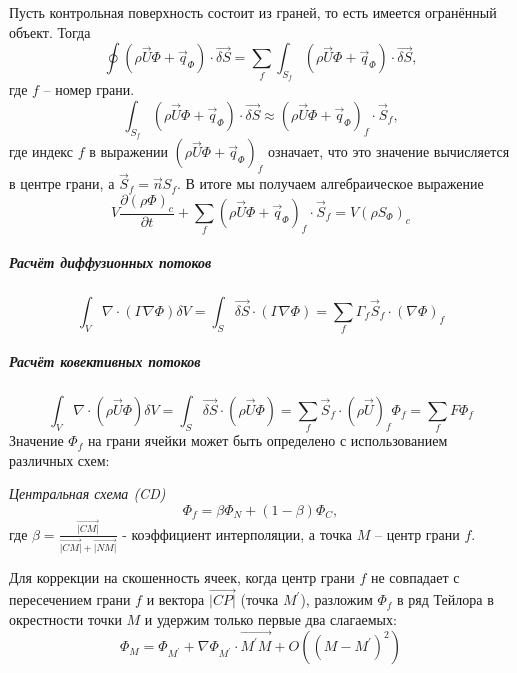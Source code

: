 			Пусть контрольная поверхность состоит из граней, то есть имеется огранённый объект. Тогда
			\begin{equation}
				\oint\left(\rho \vec{U} \Phi + \vec{q}_{\Phi} \right) \cdot \vec{\delta S} = \sum_f \int_{S_f} \left(\rho \vec{U} \Phi + \vec{q}_{\Phi} \right) \cdot \vec{\delta S},
			\end{equation}
			где $f$ -- номер грани.
			\begin{equation}
				\int_{S_f} \left(\rho \vec{U} \Phi + \vec{q}_{\Phi} \right) \cdot \vec{\delta S} \approx \left(\rho \vec{U} \Phi + \vec{q}_{\Phi} \right)_f \cdot \vec{S}_f,
			\end{equation}
			где индекс $f$ в выражении $\left(\rho \vec{U} \Phi  + \vec{q}_{\Phi}\right)_f$ означает, что это значение вычисляется в центре грани, а $\vec{S}_f = \vec{n} S_f$. В итоге мы получаем алгебраическое выражение
			\begin{equation}
				V\frac{\partial \left( \rho \Phi \right)_c}{\partial t} + \sum_f \left( \rho \vec{U} \Phi + \vec{q}_{\Phi} \right)_f \cdot \vec{S}_f = V \left( \rho S_{\Phi} \right)_c
			\end{equation}
		\subparagraph{Расчёт диффузионных потоков}
		\begin{equation}
			\int_V \nabla \cdot \left( \Gamma \nabla \Phi \right) \delta V = \int_S \vec{\delta S} \cdot (\Gamma \nabla \Phi) = \sum_f \Gamma_f \vec{S}_f \cdot (\nabla \Phi)_f
		\end{equation}
		\subparagraph{Расчёт ковективных потоков}
		\begin{equation}
			\int_V \nabla \cdot (\rho \vec{U} \Phi) \delta V = \int_S \vec{\delta S} \cdot (\rho \vec{U} \Phi) = \sum_f \vec{S}_f \cdot (\rho \vec{U})_f \Phi_f = \sum_f F \Phi_f
		\end{equation}
		Значение $\Phi_f$ на грани ячейки может быть определено с использованием различных схем:
		
		\textit{Центральная схема (CD)}
		\begin{equation}
		\Phi_f = \beta \Phi_N + (1-\beta)\Phi_C,
		\end{equation}
		где $\beta=\frac{\vec{|CM|}}{\vec{|CM|} + \vec{|NM|}}$ - коэффициент интерполяции, а точка $M$ -- центр грани $f$.
		
		Для коррекции на скошенность ячеек, когда центр грани $f$ не совпадает с пересечением грани $f$ и вектора $\vec{|CP|}$ (точка $M^{'}$), разложим $\Phi_f$ в ряд Тейлора в окрестности точки $M$ и удержим только первые два слагаемых:
		\begin{equation}
			\Phi_M = \Phi_{M^{'}} + \nabla \Phi_{M^{'}} \cdot \vec{M^{'}M} + O\left(\left(M-M^{'}\right)^2\right)
		\end{equation}
		

